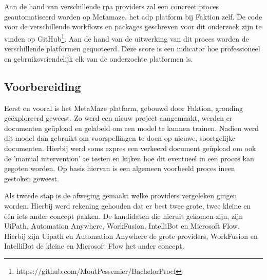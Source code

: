 
\chapter{}
\label{ch:methodologie}


Aan de hand van verschillende \acrshort{rpa} providers zal een concreet proces geautomatiseerd worden op Metamaze, het \acrfull{adp} platform bij Faktion zelf. De code voor de verschillende workflows en packages geschreven voor dit onderzoek zijn te vinden op GitHub\footnote{https://github.com/MoutPessemier/BachelorProef}. Aan de hand van de uitwerking van dit proces worden de verschillende platformen gequoteerd. Deze score is een indicator hoe professioneel en gebruiksvriendelijk elk van de onderzochte platformen is.


\section{Voorbereiding}
Eerst en vooral is het MetaMaze platform, gebouwd door Faktion, gronding geëxploreerd geweest. Zo werd een nieuw project aangemaakt, werden er documenten geüpload en gelabeld om een model te kunnen trainen. Nadien werd dit model dan gebruikt om voorspellingen te doen op nieuwe, soortgelijke documenten. Hierbij werd soms expres een verkeerd document geüpload om ook de 'manual intervention' te testen en kijken hoe dit eventueel in een proces kan gegoten worden. Op basis hiervan is een algemeen voorbeeld proces ineen gestoken geweest.

Als tweede stap is de afweging gemaakt welke providers vergeleken gingen worden. Hierbij werd rekening gehouden dat er best twee grote, twee kleine en één iets ander concept pakken. De kandidaten die hieruit gekomen zijn, zijn UiPath, Automation Anywhere, WorkFusion, IntelliBot en Microsoft Flow. Hierbij zijn Uipath en Automation Anywhere de grote providers, WorkFusion en IntelliBot de kleine en Microsoft Flow het ander concept.

